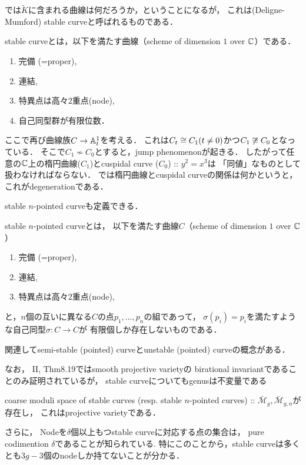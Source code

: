 \documentclass[a4paper]{jsarticle}
\newcommand{\modM}{\mathcal{M}}
\begin{document}
    では$\tilde{K}$に含まれる曲線は何だろうか，ということになるが，
    これは(Deligne-Mumford) stable curveと呼ばれるものである．
    \begin{Def}
        stable curveとは，以下を満たす曲線（scheme of dimension $1$ over $\mathbb{C}$）である．
        \begin{enumerate}
            \item 完備 (=proper),
            \item 連結,
            \item 特異点は高々2重点(node),
            \item 自己同型群が有限位数．
        \end{enumerate}
    \end{Def}

    ここで再び曲線族$C \to \mathbb{A}^1_t$を考える．
    これは$C_t \cong C_1 (t \neq 0)$かつ$C_1 \not \cong C_0$となっている．
    そこで$C_1 \not \sim C_0$とすると，jump phenomenonが起きる．
    したがって任意の$\mathbb{C}$上の楕円曲線($C_1$)とcuspidal curve ($C_0$) :: $y^2=x^3$は
    「同値」なものとして扱わなければならない．
    では楕円曲線とcuspidal curveの関係は何かというと，
    これがdegenerationである．

    stable $n$-pointed curveも定義できる．
    \begin{Def}
        stable $n$-pointed curveとは，
        以下を満たす曲線$C$（scheme of dimension $1$ over $\mathbb{C}$）
        \begin{enumerate}
            \item 完備 (=proper),
            \item 連結,
            \item 特異点は高々2重点(node),
        \end{enumerate}
        と，$n$個の互いに異なる$C$の点$p_1,\dots,p_n$の組であって，
        $\sigma(p_i)=p_i$を満たすような自己同型$\sigma: C \to C$が
        有限個しか存在しないものである．
    \end{Def}
    関連してsemi-stable (pointed) curveとunstable (pointed) curveの概念がある．

    なお，\cite{HarAG} II, Thm8.19ではsmooth projective varietyの
    birational invariantであることのみ証明されているが，
    stable curveについてもgenusは不変量である

    \begin{Thm}
        coarse moduli space of stable curves (resp. stable $n$-pointed curves)
        :: $\bar{\modM}_g, \bar{\modM}_{g,n}$が存在し，
        これはprojective varietyである．
    \end{Thm}
    さらに，
    Nodeを$\delta$個以上もつstable curveに対応する点の集合は，
    pure codimention $\delta$であることが知られている.
    特にこのことから，stable curveは多くとも$3g-3$個のnodeしか持てないことが分かる．



\end{document}
